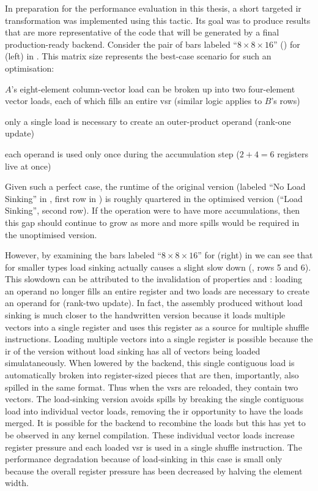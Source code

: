 \documentclass[\main/thesis.tex]{subfiles}
\begin{document}
In preparation for the performance evaluation in this thesis, a short targeted \gls{ir} transformation was implemented using this tactic.
Its goal was to produce results that are more representative of the code that will be generated by a final production-ready backend.
Consider the pair of bars labeled ``$8 \times 8 \times 16$'' () for  (left) in .
This matrix size represents the best-case scenario for such an optimisation:
\begin{enumerate*}[itemjoin={{; }}, itemjoin*={{; and }}, label={\protect\circled{\arabic*}}, after={.}]
  \item $A$'s eight-element column-vector load can be broken up into two four-element vector loads, each of which fills an entire \gls{vsr} (similar logic applies to $B$'s rows)
  \item only a single load is necessary to create an outer-product operand (rank-one update)
  \item each operand is used only once during the accumulation step ($2+4=6$ registers \gls{live} at once)
\end{enumerate*}
Given such a perfect case, the runtime of the original version (labeled ``No Load Sinking'' in , first row in ) is roughly quartered in the optimised version (``Load Sinking'', second row).
If the operation were to have more accumulations, then this gap should continue to grow as more and more spills would be required in the unoptimised version.

However, by examining the bars labeled ``$8 \times 8 \times 16$'' for  (right) in  we can see that for smaller types load sinking actually causes a slight slow down (, rows 5 and 6).
This slowdown can be attributed to the invalidation of properties  and : loading an  operand no longer fills an entire register and two loads are necessary to create an operand for  (rank-two update).
In fact, the assembly produced without load sinking is much closer to the handwritten version because it loads multiple vectors into a single register and uses this register as a source for multiple shuffle instructions.
Loading multiple vectors into a single register is possible because the \gls{ir} of the version without load sinking has all of vectors being loaded simulataneously.
When lowered by the backend, this single contiguous load is automatically broken into register-sized pieces that are then, importantly, also spilled in the same format.
Thus when the \glspl{vsr} are reloaded, they contain two  vectors.
The load-sinking version avoids spills by breaking the single contiguous load into individual vector loads, removing the \gls{ir} opportunity to have the loads merged.
It is possible for the backend to recombine the loads but this has yet to be observed in any kernel compilation.
These individual vector loads increase register pressure and each loaded \gls{vsr} is used in a single shuffle instruction.
The performance degradation because of load-sinking in this case is small only because the overall register pressure has been decreased by halving the element width.
\end{document}
